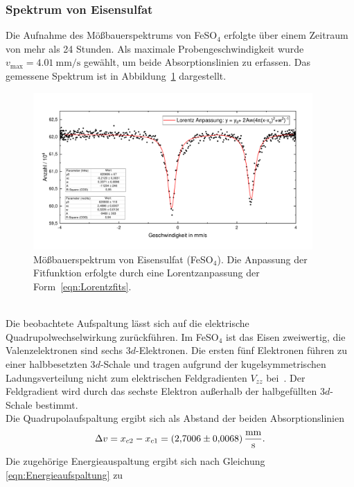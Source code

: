 \documentclass[a4paper,twoside,final]{article}
\begin{document}
\subsubsection{Spektrum von Eisensulfat}
Die Aufnahme des Mößbauerspektrums von FeSO$_4$ erfolgte über einem Zeitraum von mehr als 24 Stunden. Als maximale Probengeschwindigkeit wurde $v_\text{max} = \SI{4,01}{\milli\metre\per\second}$ gewählt, um beide Absorptionslinien zu erfassen. Das gemessene Spektrum ist in Abbildung~\ref{fig:Moessbauer_FeSO4_Lorentz.pdf} dargestellt.
\begin{figure}[htp]
    \centering
    \vspace{-0.5cm}
    \includegraphics[width=0.95\textwidth]{Bilder/Moessbauer_FeSO4_Lorentz.pdf}
    \caption{Mößbauerspektrum von Eisensulfat (FeSO$_4$). Die Anpassung der Fitfunktion erfolgte durch eine Lorentzanpassung der Form~\eqref{eqn:Lorentzfits}.}
    \label{fig:Moessbauer_FeSO4_Lorentz.pdf}
\end{figure}\\
Die beobachtete Aufspaltung lässt sich auf die elektrische Quadrupolwechselwirkung zurückführen. Im FeSO$_4$ ist das Eisen zweiwertig, die Valenzelektronen sind sechs 3$d$-Elektronen. Die ersten fünf Elektronen führen zu einer halbbesetzten 3$d$-Schale und tragen aufgrund der kugelsymmetrischen Ladungsverteilung nicht zum elektrischen Feldgradienten $V_{zz}$ bei~\cite{Schatz}. Der Feldgradient wird durch das sechste Elektron außerhalb der halbgefüllten 3$d$-Schale bestimmt.\\
Die Quadrupolaufspaltung ergibt sich als Abstand der beiden Absorptionslinien
\begin{align}
  \Delta v = x_{c2} - x_{c1} = \SI[per-mode=fraction, separate-uncertainty]{2,7006 \pm 0,0068}{\milli\metre\per\second}.
\end{align}
Die zugehörige Energieauspaltung ergibt sich nach Gleichung \eqref{eqn:Energieaufspaltung} zu
\end{document}
